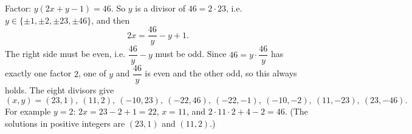Factor: $y(2x+y-1)=46$. So $y$ is a divisor of $46=2\cdot23$, i.e. $y\in\{\pm1,\pm2,\pm23,\pm46\}$, and then
\[
2x=\dfrac{46}{y}-y+1 .
\]
The right side must be even, i.e. $\dfrac{46}{y}-y$ must be odd. Since $46=y\cdot\dfrac{46}{y}$ has exactly one factor $2$, one of $y$ and $\dfrac{46}{y}$ is even and the other odd, so this always holds. The eight divisors give
\[
\boxed{(x,y)=(23,1),\ (11,2),\ (-10,23),\ (-22,46),\ (-22,-1),\ (-10,-2),\ (11,-23),\ (23,-46)}.
\]
For example $y=2$: $2x=23-2+1=22$, $x=11$, and $2\cdot11\cdot2+4-2=46$. (The solutions in positive integers are $(23,1)$ and $(11,2)$.)
